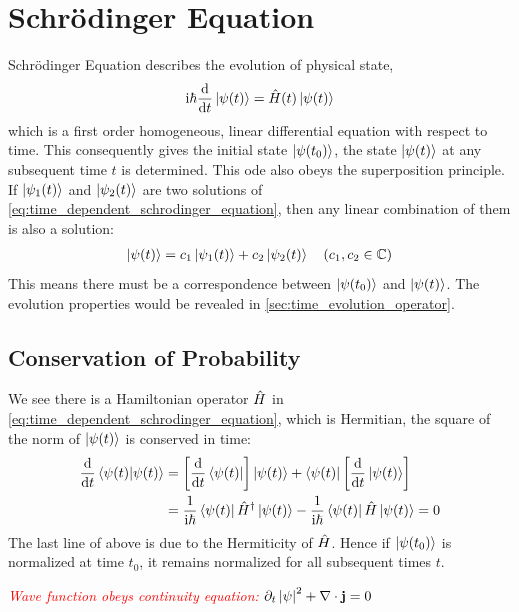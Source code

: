 \section{Schrödinger Equation}
Schrödinger Equation describes the evolution of physical state, 
\begin{align}
    \mathrm{i} \hbar \frac{\mathrm{d}}{\mathrm{d} t} \ket{\psi(t)} = \hat{H}(t) \ket{\psi(t)} \label{eq:time_dependent_schrodinger_equation}
\end{align}
which is a first order homogeneous, linear differential equation with respect to time. This consequently gives the initial state $\ket{\psi(t_0)}$, the state $\ket{\psi(t)}$ at any subsequent time $t$ is determined. This ode also obeys the superposition principle. If $\ket{\psi_1(t)}$ and $\ket{\psi_2(t)}$ are two solutions of \cref{eq:time_dependent_schrodinger_equation}, then any linear combination of them is also a solution:
\begin{align}
    \ket{\psi(t)} = c_1 \ket{\psi_1(t)} + c_2 \ket{\psi_2(t)} \quad (c_1,c_2 \in \mathbb{C})
\end{align}
This means there must be a correspondence between $\ket{\psi(t_0)}$ and $\ket{\psi(t)}$. The evolution properties would be revealed in \cref{sec:time_evolution_operator}. 
\subsection{Conservation of Probability}
We see there is a Hamiltonian operator $\hat{H}$ in \cref{eq:time_dependent_schrodinger_equation}, which is Hermitian, the square of the norm of $\ket{\psi(t)}$ is conserved in time: 
\begin{align}
    \frac{\mathrm{d}}{\mathrm{d} t} \braket{\psi(t)|\psi(t)} &= \left[\frac{\mathrm{d}}{\mathrm{d} t} \bra{\psi(t)}\right] \ket{\psi(t)} + \bra{\psi(t)} \left[\frac{\mathrm{d}}{\mathrm{d} t} \ket{\psi(t)}\right] \\
    &= \frac{1}{\mathrm{i} \hbar} \bra{\psi(t)} \hat{H}^ \dag \ket{\psi(t)} - \frac{1}{\mathrm{i} \hbar} \bra{\psi(t)} \hat{H} \ket{\psi(t)} = 0
\end{align}
The last line of above is due to the Hermiticity of $\hat{H}$. Hence if $\ket{\psi(t_0)}$ is normalized at time $t_0$, it remains normalized for all subsequent times $t$.









\textcolor{red}{\emph{Wave function obeys continuity equation:}} $\partial_t \left| \psi \right|^2 + \nabla \cdot \mathbf{j} = 0$

